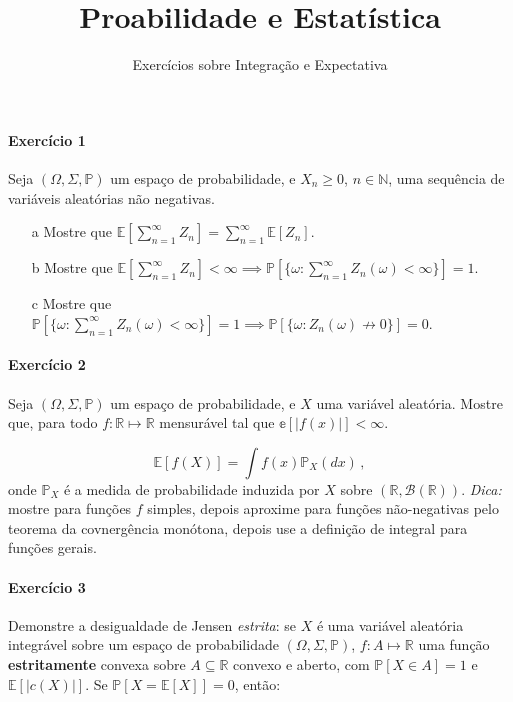 \documentclass[10pt,a4paper]{article}
\title{\large Proabilidade e Estatística}
\author{\normalsize Exercícios sobre Integração e Expectativa}
\date{}
\begin{document}
	\maketitle
	\paragraph{Exercício 1} Seja $(\Omega, \Sigma, \mathbb{P})$ um espaço de probabilidade, e $X_n\geq0$, $n \in \mathbb{N}$, uma sequência de variáveis aleatórias não negativas.
	
	\begin{itemize}
		\item[a] Mostre que $\mathbb{E}[\sum_{n=1}^\infty Z_n] = \sum_{n=1}^\infty \mathbb{E}[Z_n]$.
		\item[b] Mostre que $\mathbb{E}[\sum_{n=1}^\infty Z_n] < \infty \implies \mathbb{P}[\{\omega:\sum_{n=1}^\infty Z_n(\omega) <\infty \}] = 1$.
		\item[c] Mostre que $\mathbb{P}[\{\omega:\sum_{n=1}^\infty Z_n(\omega) <\infty \}] = 1 \implies \mathbb{P}[\{\omega: Z_n(\omega)\nrightarrow 0\}] = 0$.
\end{itemize}

\paragraph{Exercício 2} Seja $(\Omega, \Sigma,\mathbb{P})$ um espaço de probabilidade, e $X$ uma variável aleatória. Mostre que, para todo $f: \mathbb{R} \mapsto \mathbb{R}$ mensurável tal que $\mathbb{e}[|f(x)|]<\infty$.

$$\mathbb{E}[f(X)] = \int f(x) \mathbb{P}_X(dx)\,, $$
onde $\mathbb{P}_X$ é a medida de probabilidade induzida por $X$ sobre $(\mathbb{R}, \mathcal{B}(\mathbb{R}))$. \textit{Dica:} mostre para funções $f$ simples, depois aproxime para funções não-negativas pelo teorema da covnergência monótona, depois use a definição de integral para funções gerais.

\paragraph{Exercício 3} Demonstre a desigualdade de Jensen \emph{estrita}: se $X$ é uma variável aleatória integrável sobre um espaço de probabilidade $(\Omega,\Sigma,\mathbb{P})$, $f: A \mapsto \mathbb{R}$ uma função \textbf{estritamente} convexa sobre $A \subseteq \mathbb{R}$ convexo e aberto, com $\mathbb{P}[X\in A] = 1$ e $\mathbb{E}[|c(X)|]$. Se $\mathbb{P}[X = \mathbb{E}[X]] = 0$, então:
\end{document}
